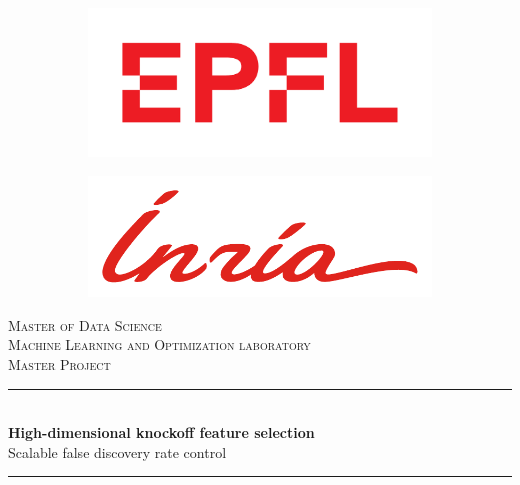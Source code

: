 
\begin{titlepage}
\begin{center}


\null\vspace{2cm}

\begin{figure}[H]
	\centering
	\begin{subfigure}{.5\textwidth}
		\centering
		\includegraphics[width=0.6\linewidth]{figures/epfl.pdf}
	\end{subfigure}%
	\begin{subfigure}{.5\textwidth}
		\centering
		\includegraphics[width=0.6\linewidth]{figures/inria_pms.pdf}
	\end{subfigure}
\end{figure}

\vspace{2cm}

\textsc{\Large Master of Data Science}\\
\textsc{\large Machine Learning and Optimization laboratory}\\
\textsc{\large Master Project}\\

\vspace{1cm}

\rule{0.85\textwidth}{1.5pt}\\[8pt]
{\huge \textbf{High-dimensional knockoff feature selection}}\\[6pt]
{\Large Scalable false discovery rate control}\\[2pt]
\rule{0.85\textwidth}{2pt}\\

\vspace{3cm}


\end{center}
\end{titlepage}
